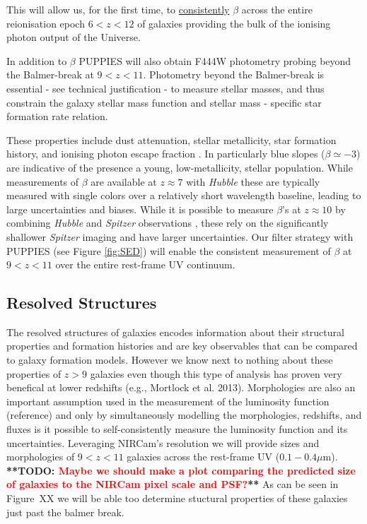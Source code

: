 \documentclass[12pt]{article}
\newcommand{\todo}[1]{\textbf{**TODO: \textcolor{red}{#1}**}}
\begin{document}
This will allow us, for the first time, to \underline{consistently} $\beta$ across the entire reionisation epoch $6<z<12$ of galaxies providing the bulk of the ionising photon output of the Universe. 

In addition to $\beta$ PUPPIES will also obtain F444W photometry probing beyond the Balmer-break at $9<z<11$. Photometry beyond the Balmer-break is essential - see technical justification - to measure stellar masses, and thus constrain the galaxy stellar mass function and stellar mass - specific star formation rate relation. 





 These properties include dust attenuation, stellar metallicity, star formation history, and ionising photon escape fraction \cite{2013MNRAS.430.2885W}. In particularly blue slopes ($\beta\simeq -3$) are indicative of the presence a young, low-metallicity, stellar population. While measurements of $\beta$ are available at $z\approx 7$ with {\em Hubble} these are typically measured with single colors over a relatively short wavelength baseline, leading to large uncertainties and biases. While it is possible to measure $\beta$'s at $z\approx 10$ by combining {\em Hubble} and {\em Spitzer} observations \cite{2016MNRAS.455..659W}, these rely on the significantly shallower {\em Spitzer} imaging and have larger uncertainties. Our filter strategy with PUPPIES (see Figure \ref{fig:SED}) will enable the consistent measurement of $\beta$ at $9<z<11$ over the entire rest-frame UV continuum. 







\subsection{\bf Resolved Structures}

The resolved structures of galaxies encodes information about their structural properties and formation histories and are key observables that can be compared to galaxy formation models.  However we know next to nothing about these properties of $z > 9$ galaxies even though this type of analysis has proven very benefical at lower redshifts (e.g., Mortlock et al. 2013).  Morphologies are also an important assumption used in the measurement of the luminosity function (reference) and only by simultaneously modelling the morphologies, redshifts, and fluxes is it possible to self-consistently measure the luminosity function and its uncertainties. Leveraging NIRCam's resolution we will provide sizes and morphologies of $9<z<11$ galaxies across the rest-frame UV ($0.1-0.4\mu$m). \todo{Maybe we should make a plot comparing the predicted size of galaxies to the NIRCam pixel scale and PSF?}  As can be seen in Figure~XX we will be able too determine stuctural properties of these galaxies just past the balmer break.
\end{document}
